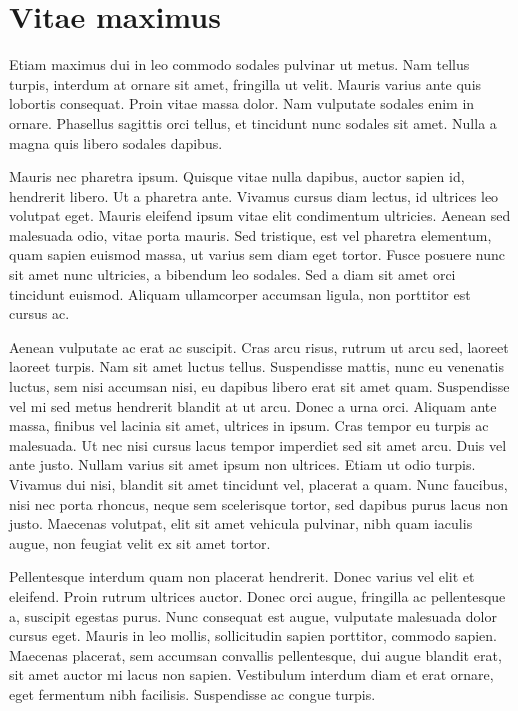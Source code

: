 \section{Vitae maximus}

Etiam maximus dui in leo commodo sodales pulvinar ut metus. Nam tellus turpis, interdum at ornare sit amet, fringilla ut velit. Mauris varius ante quis lobortis consequat. Proin vitae massa dolor. Nam vulputate sodales enim in ornare. Phasellus sagittis orci tellus, et tincidunt nunc sodales sit amet. Nulla a magna quis libero sodales dapibus.

Mauris nec pharetra ipsum. Quisque vitae nulla dapibus, auctor sapien id, hendrerit libero. Ut a pharetra ante. Vivamus cursus diam lectus, id ultrices leo volutpat eget. Mauris eleifend ipsum vitae elit condimentum ultricies. Aenean sed malesuada odio, vitae porta mauris. Sed tristique, est vel pharetra elementum, quam sapien euismod massa, ut varius sem diam eget tortor. Fusce posuere nunc sit amet nunc ultricies, a bibendum leo sodales. Sed a diam sit amet orci tincidunt euismod. Aliquam ullamcorper accumsan ligula, non porttitor est cursus ac.

Aenean vulputate ac erat ac suscipit. Cras arcu risus, rutrum ut arcu sed, laoreet laoreet turpis. Nam sit amet luctus tellus. Suspendisse mattis, nunc eu venenatis luctus, sem nisi accumsan nisi, eu dapibus libero erat sit amet quam. Suspendisse vel mi sed metus hendrerit blandit at ut arcu. Donec a urna orci. Aliquam ante massa, finibus vel lacinia sit amet, ultrices in ipsum. Cras tempor eu turpis ac malesuada. Ut nec nisi cursus lacus tempor imperdiet sed sit amet arcu. Duis vel ante justo. Nullam varius sit amet ipsum non ultrices. Etiam ut odio turpis. Vivamus dui nisi, blandit sit amet tincidunt vel, placerat a quam. Nunc faucibus, nisi nec porta rhoncus, neque sem scelerisque tortor, sed dapibus purus lacus non justo. Maecenas volutpat, elit sit amet vehicula pulvinar, nibh quam iaculis augue, non feugiat velit ex sit amet tortor.

Pellentesque interdum quam non placerat hendrerit. Donec varius vel elit et eleifend. Proin rutrum ultrices auctor. Donec orci augue, fringilla ac pellentesque a, suscipit egestas purus. Nunc consequat est augue, vulputate malesuada dolor cursus eget. Mauris in leo mollis, sollicitudin sapien porttitor, commodo sapien. Maecenas placerat, sem accumsan convallis pellentesque, dui augue blandit erat, sit amet auctor mi lacus non sapien. Vestibulum interdum diam et erat ornare, eget fermentum nibh facilisis. Suspendisse ac congue turpis. 